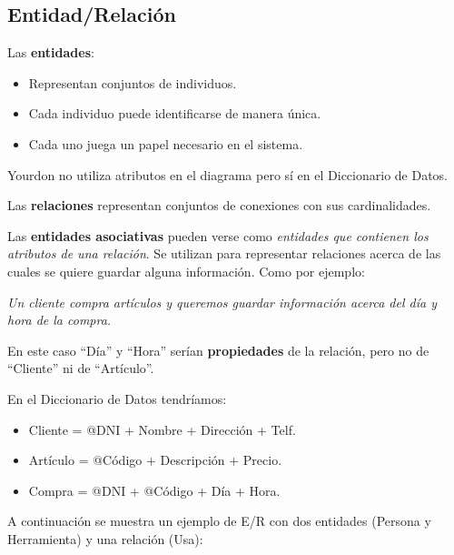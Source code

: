 \subsection{Entidad/Relación}

Las \textbf{entidades}:

\begin{itemize}[noitemsep]
\item Representan conjuntos de individuos.
\item Cada individuo puede identificarse de manera única.
\item Cada uno juega un papel necesario en el sistema.
\end{itemize}

Yourdon no utiliza atributos en el diagrama pero sí en el Diccionario de Datos.

Las \textbf{relaciones} representan conjuntos de conexiones con sus cardinalidades.

Las \textbf{entidades asociativas} pueden verse como \textit{entidades que contienen los atributos de una relación}. Se utilizan para representar relaciones acerca de las cuales se quiere guardar alguna información. Como por ejemplo:

\textit{Un cliente compra artículos y queremos guardar información acerca del día y hora de la compra.}

En este caso ``Día'' y ``Hora'' serían \textbf{propiedades} de la relación, pero no de ``Cliente'' ni de ``Artículo''.

En el Diccionario de Datos tendríamos:

\begin{itemize}[noitemsep]
\item Cliente = @DNI + Nombre + Dirección + Telf.
\item Artículo = @Código + Descripción + Precio.
\item Compra = @DNI + @Código + Día + Hora.
\end{itemize}

A continuación se muestra un ejemplo de E/R con dos entidades
(Persona y Herramienta) y una relación (Usa):

\begin{center}
\end{center}

